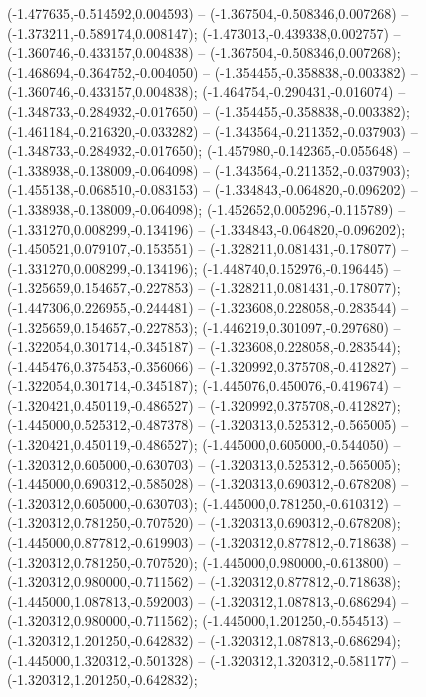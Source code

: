  (-1.477635,-0.514592,0.004593) -- (-1.367504,-0.508346,0.007268) -- (-1.373211,-0.589174,0.008147);
 (-1.473013,-0.439338,0.002757) -- (-1.360746,-0.433157,0.004838) -- (-1.367504,-0.508346,0.007268);
 (-1.468694,-0.364752,-0.004050) -- (-1.354455,-0.358838,-0.003382) -- (-1.360746,-0.433157,0.004838);
 (-1.464754,-0.290431,-0.016074) -- (-1.348733,-0.284932,-0.017650) -- (-1.354455,-0.358838,-0.003382);
 (-1.461184,-0.216320,-0.033282) -- (-1.343564,-0.211352,-0.037903) -- (-1.348733,-0.284932,-0.017650);
 (-1.457980,-0.142365,-0.055648) -- (-1.338938,-0.138009,-0.064098) -- (-1.343564,-0.211352,-0.037903);
 (-1.455138,-0.068510,-0.083153) -- (-1.334843,-0.064820,-0.096202) -- (-1.338938,-0.138009,-0.064098);
 (-1.452652,0.005296,-0.115789) -- (-1.331270,0.008299,-0.134196) -- (-1.334843,-0.064820,-0.096202);
 (-1.450521,0.079107,-0.153551) -- (-1.328211,0.081431,-0.178077) -- (-1.331270,0.008299,-0.134196);
 (-1.448740,0.152976,-0.196445) -- (-1.325659,0.154657,-0.227853) -- (-1.328211,0.081431,-0.178077);
 (-1.447306,0.226955,-0.244481) -- (-1.323608,0.228058,-0.283544) -- (-1.325659,0.154657,-0.227853);
 (-1.446219,0.301097,-0.297680) -- (-1.322054,0.301714,-0.345187) -- (-1.323608,0.228058,-0.283544);
 (-1.445476,0.375453,-0.356066) -- (-1.320992,0.375708,-0.412827) -- (-1.322054,0.301714,-0.345187);
 (-1.445076,0.450076,-0.419674) -- (-1.320421,0.450119,-0.486527) -- (-1.320992,0.375708,-0.412827);
 (-1.445000,0.525312,-0.487378) -- (-1.320313,0.525312,-0.565005) -- (-1.320421,0.450119,-0.486527);
 (-1.445000,0.605000,-0.544050) -- (-1.320312,0.605000,-0.630703) -- (-1.320313,0.525312,-0.565005);
 (-1.445000,0.690312,-0.585028) -- (-1.320313,0.690312,-0.678208) -- (-1.320312,0.605000,-0.630703);
 (-1.445000,0.781250,-0.610312) -- (-1.320312,0.781250,-0.707520) -- (-1.320313,0.690312,-0.678208);
 (-1.445000,0.877812,-0.619903) -- (-1.320312,0.877812,-0.718638) -- (-1.320312,0.781250,-0.707520);
 (-1.445000,0.980000,-0.613800) -- (-1.320312,0.980000,-0.711562) -- (-1.320312,0.877812,-0.718638);
 (-1.445000,1.087813,-0.592003) -- (-1.320312,1.087813,-0.686294) -- (-1.320312,0.980000,-0.711562);
 (-1.445000,1.201250,-0.554513) -- (-1.320312,1.201250,-0.642832) -- (-1.320312,1.087813,-0.686294);
 (-1.445000,1.320312,-0.501328) -- (-1.320312,1.320312,-0.581177) -- (-1.320312,1.201250,-0.642832);
